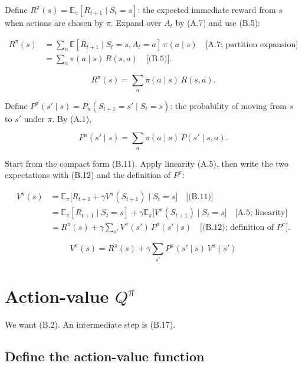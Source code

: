 Define $R^\pi(s)=\mathbb{E}_\pi[R_{t+1}\mid S_t=s]$: the expected immediate reward from $s$ when actions are chosen by $\pi$. Expand over $A_t$ by (A.7) and use (B.5):

\[
\begin{aligned}
R^\pi(s)
&=
\sum_a
\mathbb{E}[R_{t+1}\mid S_t=s,A_t=a]
\,
\pi(a\mid s)
\quad\text{[A.7; partition expansion]}
\\
&=
\sum_a\pi(a\mid s)\, R(s,a)
\quad\text{[(B.5)]}.
\end{aligned}
\]

\begin{equation}
R^\pi(s)
=
\sum_a\pi(a\mid s)\, R(s,a).
\tag{B.12}\label{eq:B.12}
\end{equation}

Define $P^\pi(s'\mid s)=P_\pi(S_{t+1}=s'\mid S_t=s)$: the probability of moving from $s$ to $s'$ under $\pi$. By (A.1),

\[
P^\pi(s'\mid s)
=
\sum_a\pi(a\mid s)\, P(s'\mid s,a).
\]

Start from the compact form (B.11). Apply linearity (A.5), then write the two expectations with (B.12) and the definition of $P^\pi$:

\[
\begin{aligned}
V^\pi(s)
&=
\mathbb{E}_\pi\bigl[R_{t+1}+\gamma V^\pi(S_{t+1})\mid S_t=s\bigr]
\quad\text{[(B.11)]}
\\
&=
\mathbb{E}_\pi[R_{t+1}\mid S_t=s]
+
\gamma
\mathbb{E}_\pi\bigl[V^\pi(S_{t+1})\mid S_t=s\bigr]
\quad\text{[A.5; linearity]}
\\
&=
R^\pi(s)
+
\gamma
\sum_{s'}
V^\pi(s')\, P^\pi(s'\mid s)
\quad\text{[(B.12); definition of $P^\pi$]}.
\end{aligned}
\]

\begin{equation}
\boxed{
V^\pi(s)
=
R^\pi(s)
+
\gamma
\sum_{s'}
P^\pi(s'\mid s)\, V^\pi(s')
}
\tag{B.3}
\end{equation}

\section{Action-value $Q^\pi$}

We want (B.2). An intermediate step is (B.17).

\subsection{Define the action-value function}

